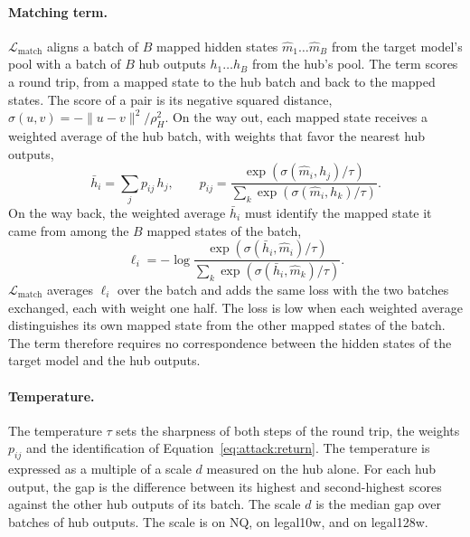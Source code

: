 \paragraph{Matching term.} $\mathcal{L}_{\text{match}}$ aligns a batch of $B$ mapped hidden states $\hat m_1 \ldots \hat m_B$ from the target model's pool with a batch of $B$ hub outputs $h_1 \ldots h_B$ from the hub's pool.
The term scores a round trip, from a mapped state to the hub batch and back to the mapped states.
The score of a pair is its negative squared distance, $\sigma(u, v) = -\lVert u - v\rVert^2 / \rho_H^2$.
On the way out, each mapped state receives a weighted average of the hub batch, with weights that favor the nearest hub outputs,
\begin{equation}
\bar h_i = \sum_{j} p_{ij}\, h_j ,
\qquad
p_{ij} = \frac{\exp(\sigma(\hat m_i, h_j)/\tau)}{\sum_{k}\exp(\sigma(\hat m_i, h_k)/\tau)} .
\label{eq:attack:match}
\end{equation}
On the way back, the weighted average $\bar h_i$ must identify the mapped state it came from among the $B$ mapped states of the batch,
\begin{equation}
\ell_i = -\log\frac{\exp(\sigma(\bar h_i, \hat m_i)/\tau)}{\sum_{k}\exp(\sigma(\bar h_i, \hat m_k)/\tau)} .
\label{eq:attack:return}
\end{equation}
$\mathcal{L}_{\text{match}}$ averages $\ell_i$ over the batch and adds the same loss with the two batches exchanged, each with weight one half. %
The loss is low when each weighted average distinguishes its own mapped state from the other mapped states of the batch.
The term therefore requires no correspondence between the hidden states of the target model and the hub outputs.

\paragraph{Temperature.} The temperature $\tau$ sets the sharpness of both steps of the round trip, the weights $p_{ij}$ and the identification of Equation~\ref{eq:attack:return}.
The temperature is expressed as a multiple of a scale $d$ measured on the hub alone.
For each hub output, the gap is the difference between its highest and second-highest scores against the other hub outputs of its batch.
The scale $d$ is the median gap over  batches of  hub outputs. %
The scale is  on NQ,  on legal10w, and  on legal128w. %

